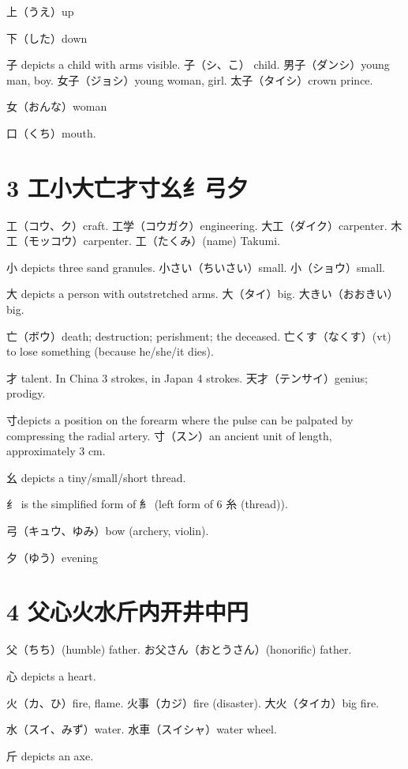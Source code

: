 上（うえ）up

下（した）down

子 depicts a child with arms visible.
子（シ、こ） child.
男子（ダンシ）young man, boy.
女子（ジョシ）young woman, girl.
太子（タイシ）crown prince.

女（おんな）woman

口（くち）mouth.

\section{3 工小大亡才寸幺纟弓夕}

工（コウ、ク）craft.
工学（コウガク）engineering.
大工（ダイク）carpenter.
木工（モッコウ）carpenter.
工（たくみ）(name) Takumi.

小 depicts three sand granules.
小さい（ちいさい）small.
小（ショウ）small.

大 depicts a person with outstretched arms.
大（タイ）big.
大きい（おおきい）big.

亡（ボウ）death; destruction; perishment; the deceased.
亡くす（なくす）(vt) to lose something (because he/she/it dies).

才 talent.
In China 3 strokes, in Japan 4 strokes.
天才（テンサイ）genius; prodigy.

寸depicts a position on the forearm
where the pulse can be palpated by compressing the radial artery.
寸（スン）an ancient unit of length, approximately 3 cm.

幺 depicts a tiny/small/short thread.

纟 is the simplified form of 糹
(left form of 6 糸 (thread)).

弓（キュウ、ゆみ）bow (archery, violin).

夕（ゆう）evening

\section{4 父心火水斤内开井中円}

父（ちち）(humble) father.
お父さん（おとうさん）(honorific) father.

心 depicts a heart.

火（カ、ひ）fire, flame.
火事（カジ）fire (disaster).
大火（タイカ）big fire.

水（スイ、みず）water.
水車（スイシャ）water wheel.

斤 depicts an axe.

